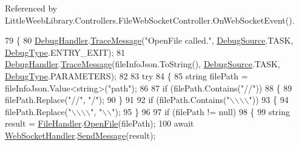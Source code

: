 Referenced by Little\+Weeb\+Library.\+Controllers.\+File\+Web\+Socket\+Controller.\+On\+Web\+Socket\+Event().


\begin{DoxyCode}
79         \{
80             \mbox{\hyperlink{class_little_weeb_library_1_1_handlers_1_1_debug_handler}{DebugHandler}}.\mbox{\hyperlink{class_little_weeb_library_1_1_handlers_1_1_debug_handler_afccb37dfd6b2114af72000c2f4fe4607}{TraceMessage}}(\textcolor{stringliteral}{"OpenFile called."}, 
      \mbox{\hyperlink{namespace_little_weeb_library_1_1_handlers_a2a6ca0775121c9c503d58aa254d292be}{DebugSource}}.TASK, \mbox{\hyperlink{namespace_little_weeb_library_1_1_handlers_ab66019ed40462876ec4e61bb3ccb0a62}{DebugType}}.ENTRY\_EXIT);
81             \mbox{\hyperlink{class_little_weeb_library_1_1_handlers_1_1_debug_handler}{DebugHandler}}.\mbox{\hyperlink{class_little_weeb_library_1_1_handlers_1_1_debug_handler_afccb37dfd6b2114af72000c2f4fe4607}{TraceMessage}}(fileInfoJson.ToString(), 
      \mbox{\hyperlink{namespace_little_weeb_library_1_1_handlers_a2a6ca0775121c9c503d58aa254d292be}{DebugSource}}.TASK, \mbox{\hyperlink{namespace_little_weeb_library_1_1_handlers_ab66019ed40462876ec4e61bb3ccb0a62}{DebugType}}.PARAMETERS);            
82 
83             \textcolor{keywordflow}{try}
84             \{
85                 \textcolor{keywordtype}{string} filePath = fileInfoJson.Value<\textcolor{keywordtype}{string}>(\textcolor{stringliteral}{"path"});
86 
87                 \textcolor{keywordflow}{if} (filePath.Contains(\textcolor{stringliteral}{"//"}))
88                 \{
89                     filePath.Replace(\textcolor{stringliteral}{"//"}, \textcolor{stringliteral}{"/"});
90                 \}
91 
92                 \textcolor{keywordflow}{if} (filePath.Contains(\textcolor{stringliteral}{"\(\backslash\)\(\backslash\)\(\backslash\)\(\backslash\)"}))
93                 \{
94                     filePath.Replace(\textcolor{stringliteral}{"\(\backslash\)\(\backslash\)\(\backslash\)\(\backslash\)"}, \textcolor{stringliteral}{"\(\backslash\)\(\backslash\)"});
95                 \}
96 
97                 \textcolor{keywordflow}{if} (filePath != null)
98                 \{
99                     \textcolor{keywordtype}{string} result = \mbox{\hyperlink{class_little_weeb_library_1_1_handlers_1_1_file_handler}{FileHandler}}.\mbox{\hyperlink{class_little_weeb_library_1_1_handlers_1_1_file_handler_a08cbef4974d973035a7ddeedb9f8ff4a}{OpenFile}}(filePath);
100                     await \mbox{\hyperlink{class_little_weeb_library_1_1_handlers_1_1_web_socket_handler}{WebSocketHandler}}.\mbox{\hyperlink{class_little_weeb_library_1_1_handlers_1_1_web_socket_handler_a1de289d54d665a32c93478c68d3e6ad0}{SendMessage}}(result);

\end{DoxyCode}
